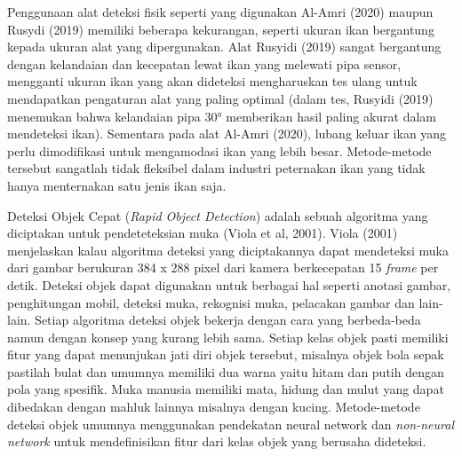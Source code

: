 Penggunaan alat deteksi fisik seperti yang digunakan Al-Amri (2020) maupun 
Rusydi (2019) memiliki beberapa kekurangan, seperti ukuran ikan bergantung 
kepada ukuran alat yang dipergunakan. Alat Rusyidi (2019) sangat bergantung 
dengan kelandaian dan kecepatan lewat ikan yang melewati pipa sensor, mengganti 
ukuran ikan yang akan dideteksi mengharuskan tes ulang untuk 
mendapatkan pengaturan alat yang paling optimal (dalam tes, Rusyidi (2019) 
menemukan bahwa kelandaian pipa 30° memberikan hasil paling akurat dalam 
mendeteksi ikan). Sementara pada alat Al-Amri (2020), lubang keluar 
ikan yang perlu dimodifikasi untuk mengamodasi ikan yang lebih besar. 
Metode-metode tersebut sangatlah tidak fleksibel dalam industri peternakan 
ikan yang tidak hanya menternakan satu jenis ikan saja.

Deteksi Objek Cepat (\emph{Rapid Object Detection}) adalah sebuah algoritma yang 
diciptakan untuk pendeteteksian muka (Viola et al, 2001). Viola (2001) 
menjelaskan kalau algoritma deteksi yang diciptakannya dapat mendeteksi 
muka dari gambar berukuran 384 x 288 pixel dari kamera berkecepatan 15 
\textit{frame} per detik. Deteksi objek dapat digunakan untuk berbagai hal seperti 
anotasi gambar, penghitungan mobil, deteksi muka, rekognisi muka, pelacakan 
gambar dan lain-lain. Setiap algoritma deteksi objek bekerja dengan cara yang 
berbeda-beda namun dengan konsep yang kurang lebih sama. Setiap kelas objek 
pasti memiliki fitur yang dapat menunjukan jati diri objek tersebut, misalnya 
objek bola sepak pastilah bulat dan umumnya memiliki dua warna yaitu hitam dan 
putih dengan pola yang spesifik. Muka manusia memiliki mata, hidung dan mulut 
yang dapat dibedakan dengan mahluk lainnya misalnya dengan kucing. Metode-metode 
deteksi objek umumnya menggunakan pendekatan neural network dan 
\textit{non-neural network} untuk mendefinisikan fitur dari kelas objek yang 
berusaha dideteksi.

